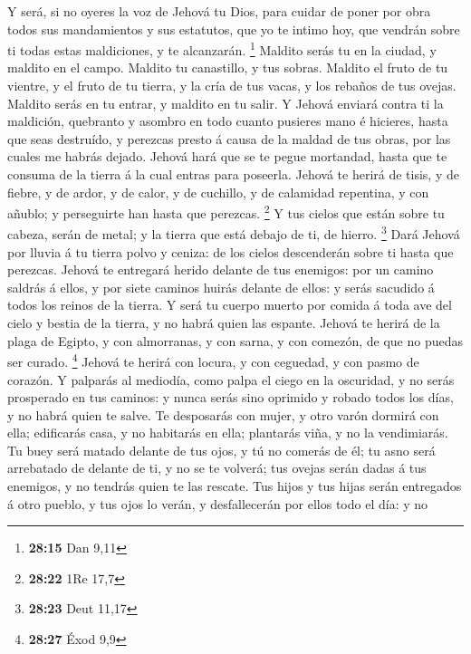  Y será, si no oyeres la voz de Jehová tu Dios, para cuidar
de poner por obra todos sus mandamientos y sus estatutos, que yo te
intimo hoy, que vendrán sobre ti todas estas maldiciones, y te
alcanzarán. \footnote{\textbf{28:15} Dan 9,11}  Maldito
serás tu en la ciudad, y maldito en el campo.  Maldito tu
canastillo, y tus sobras.  Maldito el fruto de tu vientre,
y el fruto de tu tierra, y la cría de tus vacas, y los rebaños de tus
ovejas.  Maldito serás en tu entrar, y maldito en tu salir.
 Y Jehová enviará contra ti la maldición, quebranto y
asombro en todo cuanto pusieres mano é hicieres, hasta que seas
destruído, y perezcas presto á causa de la maldad de tus obras, por las
cuales me habrás dejado.  Jehová hará que se te pegue
mortandad, hasta que te consuma de la tierra á la cual entras para
poseerla.  Jehová te herirá de tisis, y de fiebre, y de
ardor, y de calor, y de cuchillo, y de calamidad repentina, y con
añublo; y perseguirte han hasta que perezcas. \footnote{\textbf{28:22}
  1Re 17,7}  Y tus cielos que están sobre tu cabeza, serán
de metal; y la tierra que está debajo de ti, de hierro. \footnote{\textbf{28:23}
  Deut 11,17}  Dará Jehová por lluvia á tu tierra polvo y
ceniza: de los cielos descenderán sobre ti hasta que perezcas.
 Jehová te entregará herido delante de tus enemigos: por un
camino saldrás á ellos, y por siete caminos huirás delante de ellos: y
serás sacudido á todos los reinos de la tierra.  Y será tu
cuerpo muerto por comida á toda ave del cielo y bestia de la tierra, y
no habrá quien las espante.  Jehová te herirá de la plaga
de Egipto, y con almorranas, y con sarna, y con comezón, de que no
puedas ser curado. \footnote{\textbf{28:27} Éxod 9,9} 
Jehová te herirá con locura, y con ceguedad, y con pasmo de corazón.
 Y palparás al mediodía, como palpa el ciego en la
oscuridad, y no serás prosperado en tus caminos: y nunca serás sino
oprimido y robado todos los días, y no habrá quien te salve.
 Te desposarás con mujer, y otro varón dormirá con ella;
edificarás casa, y no habitarás en ella; plantarás viña, y no la
vendimiarás.  Tu buey será matado delante de tus ojos, y tú
no comerás de él; tu asno será arrebatado de delante de ti, y no se te
volverá; tus ovejas serán dadas á tus enemigos, y no tendrás quien te
las rescate.  Tus hijos y tus hijas serán entregados á otro
pueblo, y tus ojos lo verán, y desfallecerán por ellos todo el día: y no
